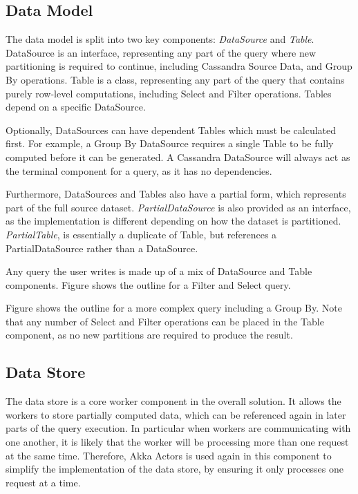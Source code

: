 
\subsection{Data Model}\label{subsec:data-model}
The data model is split into two key components: \textit{DataSource} and \textit{Table}. DataSource is an interface, representing any part of the query where new partitioning is required to continue, including Cassandra Source Data, and Group By operations. Table is a class, representing any part of the query that contains purely row-level computations, including Select and Filter operations. Tables depend on a specific DataSource. 

Optionally, DataSources can have dependent Tables which must be calculated first. For example, a Group By DataSource requires a single Table to be fully computed before it can be generated. A Cassandra DataSource will always act as the terminal component for a query, as it has no dependencies. 

Furthermore, DataSources and Tables also have a partial form, which represents part of the full source dataset. \textit{PartialDataSource} is also provided as an interface, as the implementation is different depending on how the dataset is partitioned. \textit{PartialTable}, is essentially a duplicate of Table, but references a PartialDataSource rather than a DataSource.

Any query the user writes is made up of a mix of DataSource and Table components. Figure  shows the outline for a Filter and Select query. 


Figure  shows the outline for a more complex query including a Group By. Note that any number of Select and Filter operations can be placed in the Table component, as no new partitions are required to produce the result.


\subsection{Data Store}
The data store is a core worker component in the overall solution. It allows the workers to store partially computed data, which can be referenced again in later parts of the query execution. In particular when workers are communicating with one another, it is likely that the worker will be processing more than one request at the same time. Therefore, Akka Actors is used again in this component to simplify the implementation of the data store, by ensuring it only processes one request at a time.

